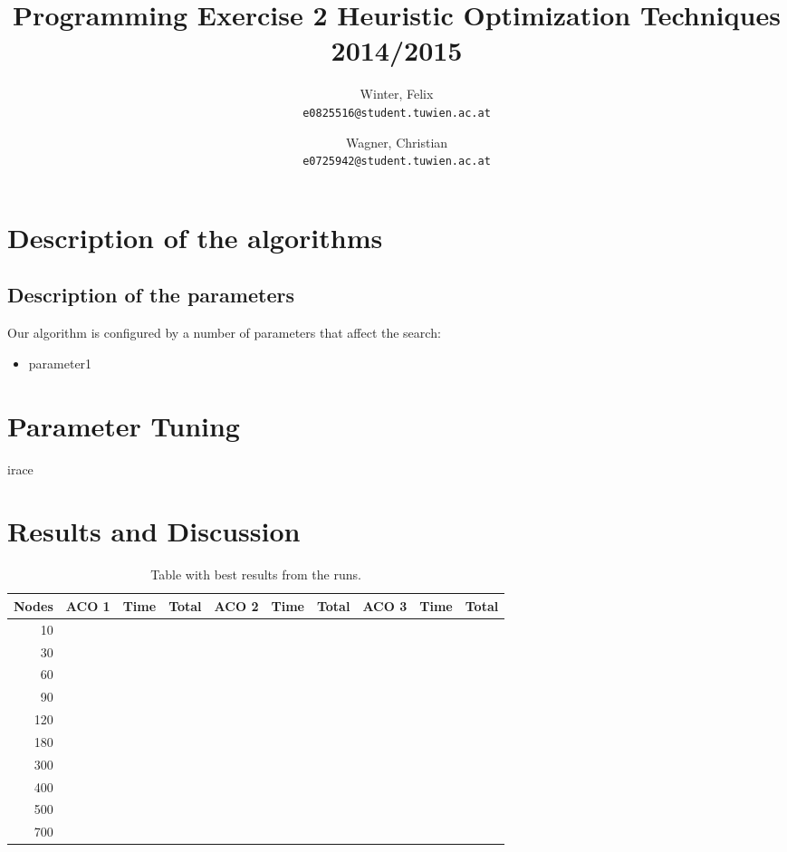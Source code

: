 \documentclass[a4paper]{scrartcl}
\author{
  Winter, Felix\\
  \texttt{e0825516@student.tuwien.ac.at}
  \and
  Wagner, Christian\\
  \texttt{e0725942@student.tuwien.ac.at}
}
\title{Programming Exercise 2 Heuristic Optimization Techniques 2014/2015}
\begin{document}
\setlength{\abovedisplayskip}{0pt}
\setlength{\belowdisplayskip}{0pt}

\begingroup
 \makeatletter
 \maketitle
\endgroup

\section{Description of the algorithms}


\subsection{Description of the parameters}
Our algorithm is configured by a number of parameters that affect the search:

\begin{itemize}
  \item parameter1
\end{itemize}

\section{Parameter Tuning}

irace \cite{lopez2011irace}


\section{Results and Discussion}


\begin{table}
    \begin{adjustwidth}{-.5in}{-.5in}  
        \begin{center}
\begin{tabular}{r | r | r | r | r | r | r | r | r | r}
\hline
Nodes & ACO 1 & Time & Total & ACO 2 & Time & Total & ACO 3 & Time & Total \\
\hline \hline 
10 &  &  &  &  &  &  &  &  &  \\
\hline
30 &  &  &  &  &  &  &  &  &  \\
\hline
60 &  &  &  &  &  &  &  &  &  \\
\hline
90 &  &  &  &  &  &  &  &  &  \\
\hline
120 &  &  &  &  &  &  &  &  &  \\
\hline
180 &  &  &  &  &  &  &  &  &  \\
\hline
300 &  &  &  &  &  &  &  &  &  \\
\hline
400 &  &  &  &  &  &  &  &  &  \\
\hline
500 &  &  &  &  &  &  &  &  &  \\
\hline
700 &  &  &  &  &  &  &  &  &  \\
\hline
\end{tabular}

        \caption{Table with best results from the runs. }
        \label{myTable}
        \end{center}
    \end{adjustwidth}
\end{table}



\end{document}
